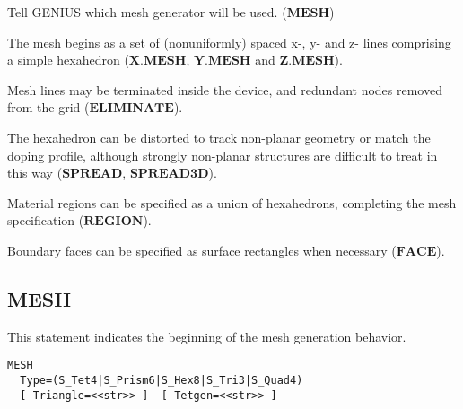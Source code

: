 \documentclass[oneside,12pt]{cgd_book}
\begin{document}
\begin{compactitem}
\item Tell GENIUS which mesh generator will be used. ($\mathbf{MESH}$)
\par
\item The mesh begins as a set of (nonuniformly) spaced x-, y- and z- lines comprising a simple hexahedron
          ($\mathbf{X.MESH}$, $\mathbf{Y.MESH}$ and $\mathbf{Z.MESH}$).
\par
\item Mesh lines may be terminated inside the device, and redundant nodes removed from the grid
          ($\mathbf{ELIMINATE}$).
\par
\item The hexahedron can be distorted to track non-planar geometry or match the doping profile, although
          strongly non-planar structures are difficult to treat in this way ($\mathbf{SPREAD}$,
$\mathbf{SPREAD3D}$).
\par
\item Material regions can be specified as a union of hexahedrons, completing the mesh specification
          ($\mathbf{REGION}$).
\par
\item Boundary faces can be specified as surface rectangles when necessary ($\mathbf{FACE}$).
\par
\end{compactitem}
\subsection{MESH}
This statement indicates the beginning of the mesh generation behavior.
\par
\begin{lstlisting}[style=GeniusCmd]
MESH
  Type=(S_Tet4|S_Prism6|S_Hex8|S_Tri3|S_Quad4)
  [ Triangle=<<str>> ]  [ Tetgen=<<str>> ]
\end{lstlisting}
\end{document}
